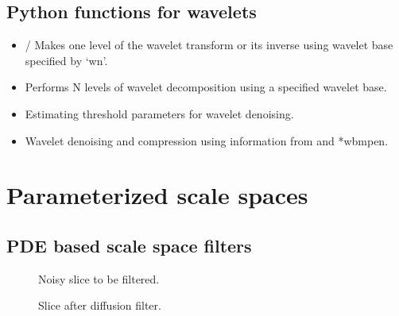 \documentclass[letterpaper,10pt,english]{sphinxmanual}
\begin{document}
\section{Python functions for wavelets}
\label{\detokenize{02-ImageEnhancement:python-functions-for-wavelets}}\begin{itemize}
\item {} 
\sphinxAtStartPar
{}/ Makes one level of the wavelet transform or its inverse using wavelet base specified by ‘wn’.

\item {} 
\sphinxAtStartPar
{} Performs N levels of wavelet decomposition using a specified wavelet base.

\item {} 
\sphinxAtStartPar
{} Estimating threshold parameters for wavelet denoising.

\item {} 
\sphinxAtStartPar
{} Wavelet denoising and compression using information from  and *wbmpen.

\end{itemize}


\chapter{Parameterized scale spaces}
\label{\detokenize{02-ImageEnhancement:parameterized-scale-spaces}}

\section{PDE based scale space filters}
\label{\detokenize{02-ImageEnhancement:pde-based-scale-space-filters}}
\begin{figure}[htbp]
\centering
\capstart

\noindent{}
\caption{Noisy slice to be filtered.}\label{\detokenize{02-ImageEnhancement:id24}}\end{figure}

\begin{figure}[htbp]
\centering
\capstart

\noindent{}
\caption{Slice after diffusion filter.}\label{\detokenize{02-ImageEnhancement:id25}}\end{figure}
\end{document}
